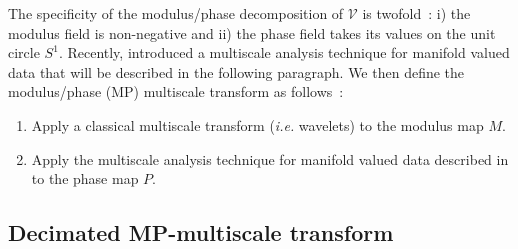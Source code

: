 The specificity of the modulus/phase decomposition of $\mathcal{V}$ is twofold~: i) the modulus field is non-negative and ii) the phase 
field takes its values on the unit circle $S^1$. Recently, \cite{rahman05} introduced a multiscale analysis technique for manifold valued 
data that will be described in the following paragraph. We then define the modulus/phase (MP) multiscale transform as follows~:
\vspace{.1cm}
\begin{center}
\begin{minipage}[b]{0.85\linewidth}
\footnotesize{
\begin{enumerate}
\item Apply a classical multiscale transform (\textit{i.e.} wavelets) to the modulus map $M$.
\item Apply the multiscale analysis technique for manifold valued data described in \cite{rahman05} to the phase map $P$. 
\end{enumerate}}
\end{minipage}
\end{center}
\vspace{.1cm}

\subsection{Decimated MP-multiscale transform}

